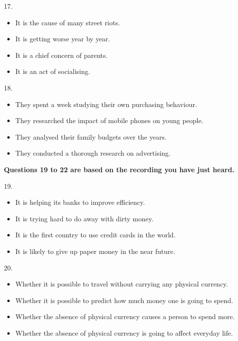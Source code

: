 \documentclass[UTF8,11pt]{ctexart}
\begin{document}
17.


\begin{itemize}[leftmargin=2em,itemsep=.2em,topsep=.4em]\item[A.] It is the cause of many street riots.
\item[B.] It is getting worse year by year.
\item[C.] It is a chief concern of parents.
\item[D.] It is an act of socialising.
\end{itemize}

18.


\begin{itemize}[leftmargin=2em,itemsep=.2em,topsep=.4em]\item[A.] They spent a week studying their own purchasing behaviour.
\item[B.] They researched the impact of mobile phones on young people.
\item[C.] They analysed their family budgets over the years.
\item[D.] They conducted a thorough research on advertising.
\end{itemize}

\textbf{Questions 19 to 22 are based on the recording you have just heard.}


19.


\begin{itemize}[leftmargin=2em,itemsep=.2em,topsep=.4em]\item[A.] It is helping its banks to improve efficiency.
\item[B.] It is trying hard to do away with dirty money.
\item[C.] It is the first country to use credit cards in the world.
\item[D.] It is likely to give up paper money in the near future.
\end{itemize}

20.


\begin{itemize}[leftmargin=2em,itemsep=.2em,topsep=.4em]\item[A.] Whether it is possible to travel without carrying any physical currency.
\item[B.] Whether it is possible to predict how much money one is going to spend.
\item[C.] Whether the absence of physical currency causes a person to spend more.
\item[D.] Whether the absence of physical currency is going to affect everyday life.
\end{itemize}
\end{document}
